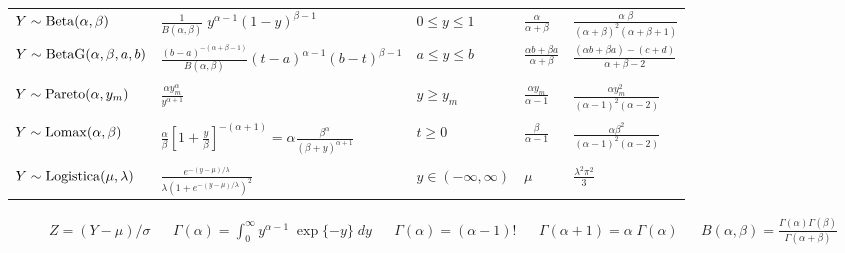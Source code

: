 \documentclass[9pt,a4paper]{extarticle}
\begin{document}
\begin{tabular}{lllll}
\\
  $Y \sim {\rm Beta}(\alpha, \beta)$ & $\frac{1}{B(\alpha,\beta)} \; y^{\alpha-1} (1-y)^{\beta-1}$  &  $0 \leq y \leq 1$ & $\frac{\alpha}{\alpha+\beta}$ & $\frac{\alpha \; \beta}{(\alpha+\beta)^2 (\alpha + \beta + 1)}$ \\
  $Y \sim {\rm BetaG}(\alpha, \beta, a, b)$ & $\frac{(b-a)^{-(\alpha+\beta-1)}}{B(\alpha,\beta)} (t-a)^{\alpha - 1} (b - t)^{\beta - 1}$  &  $a \leq y \leq b$ & $\frac{\alpha b + \beta a}{\alpha + \beta}$ & $\frac{(\alpha b + \beta a) - (c+d)}{\alpha+\beta-2}$  \\
  \\
$Y \sim {\rm Pareto}(\alpha, y_m)$ & $\frac{\alpha y_m^{\alpha}}{y^{\alpha+1}}$  &  $y \geq y_m$  & $\frac{\alpha y_m}{\alpha - 1}$ &  $\frac{\alpha y_m^2}{(\alpha - 1)^2 (\alpha - 2)}$ \\
\\
$Y \sim {\rm Lomax}(\alpha, \beta)$ & $\frac{\alpha}{\beta} \left[1 + \frac{y}{\beta} \right]^{-(\alpha+1)} = \alpha \frac{\beta^\alpha}{(\beta+y)^{\alpha + 1}}$  &  $t \geq 0$  & $\frac{\beta}{\alpha - 1}$ &  $\frac{\alpha \beta^2}{(\alpha - 1)^2 (\alpha - 2)}$ \\
\\
$Y \sim {\rm Logistica}(\mu, \lambda)$ & $\frac{e^{-(y-\mu)/\lambda}}{\lambda\left(1+e^{-(y-\mu)/\lambda}\right)^2}$  & $y \in (-\infty, \infty)$ & $\mu$ & $\frac{\lambda^2 \pi^2}{3}$ \\
\hline
\end{tabular}

\begin{align*}
  & Z = (Y-\mu)/\sigma &
  &\Gamma(\alpha) = \int_0^{\infty} y^{\alpha-1} \; \exp\{-y\} \; dy &
  & \Gamma(\alpha) = (\alpha-1)! &
  & \Gamma(\alpha+1) = \alpha\;\Gamma(\alpha) &
  &     B(\alpha, \beta) = \frac{\Gamma(\alpha)\Gamma(\beta)}{\Gamma(\alpha+\beta)}
\end{align*}

\end{document}
